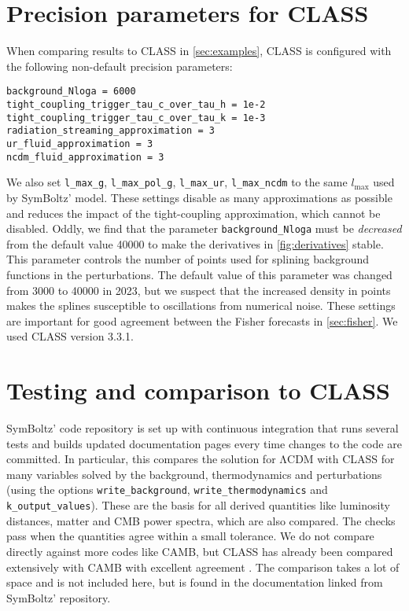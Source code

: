 \documentclass{aa}
\newcommand{\LCDM}{$\mathrm{\Lambda C D M}$}
\newcommand\lmax{l_\text{max}}
\begin{document}
\section{Precision parameters for CLASS}
\label{sec:precision}

When comparing results to CLASS in \cref{sec:examples}, CLASS is configured with the following non-default precision parameters:
\begin{codebox}
\begin{Verbatim}
background_Nloga = 6000
tight_coupling_trigger_tau_c_over_tau_h = 1e-2
tight_coupling_trigger_tau_c_over_tau_k = 1e-3
radiation_streaming_approximation = 3
ur_fluid_approximation = 3
ncdm_fluid_approximation = 3
\end{Verbatim}
\end{codebox}
We also set \texttt{l\_max\_g}, \texttt{l\_max\_pol\_g}, \texttt{l\_max\_ur}, \texttt{l\_max\_ncdm} to the same $\lmax$ used by SymBoltz' model.
These settings disable as many approximations as possible and reduces the impact of the tight-coupling approximation, which cannot be disabled.
Oddly, we find that the parameter \verb|background_Nloga| must be \emph{decreased} from the default value 40000 to make the derivatives in \cref{fig:derivatives} stable.
This parameter controls the number of points used for splining background functions in the perturbations.
The default value of this parameter was changed from 3000 to 40000 in 2023, but we suspect that the increased density in points makes the splines susceptible to oscillations from numerical noise. %
These settings are important for good agreement between the Fisher forecasts in \cref{sec:fisher}.
We used CLASS version 3.3.1.

\section{Testing and comparison to CLASS}
\label{sec:testing}

SymBoltz' code repository is set up with continuous integration that runs several tests and builds updated documentation pages every time changes to the code are committed.
In particular, this compares the solution for \LCDM{} with CLASS for many variables solved by the background, thermodynamics and perturbations (using the options \texttt{write\_background}, \texttt{write\_thermodynamics} and \texttt{k\_output\_values}).
These are the basis for all derived quantities like luminosity distances, matter and CMB power spectra, which are also compared.
The checks pass when the quantities agree within a small tolerance.
We do not compare directly against more codes like CAMB, but CLASS has already been compared extensively with CAMB with excellent agreement \citep{lesgourguesCosmicLinearAnisotropy2011c}.
The comparison takes a lot of space and is not included here, but is found in the documentation linked from SymBoltz' repository.
\end{document}
